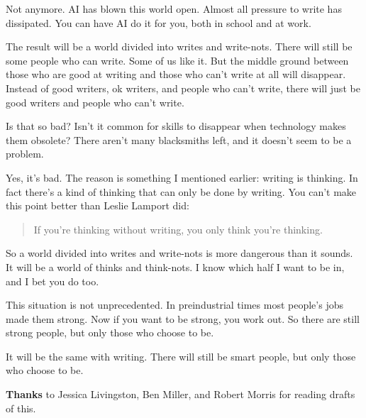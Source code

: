 Not
                  anymore. AI has blown this world open. Almost all pressure to
                  write has dissipated. You can have AI do it for you, both in
                  school and at work.

The result will be a world
                  divided into writes and write-nots. There will still be some
                  people who can write. Some of us like it. But the middle
                  ground between those who are good at writing and those who
                  can't write at all will disappear. Instead of good writers, ok
                  writers, and people who can't write, there will just be good
                  writers and people who can't write.

Is that so bad?
                  Isn't it common for skills to disappear when technology makes
                  them obsolete? There aren't many blacksmiths left, and it
                  doesn't seem to be a problem.

Yes, it's bad. The
                  reason is something I mentioned earlier: writing is thinking.
                  In fact there's a kind of thinking that can only be done by
                  writing. You can't make this point better than Leslie Lamport
                  did:
                  \begin{quote}

                    If you're thinking without writing, you only think you're
                    thinking.
                  
\end{quote}

                  So a world divided into writes and write-nots is more
                  dangerous than it sounds. It will be a world of thinks and
                  think-nots. I know which half I want to be in, and I bet you
                  do too.

This situation is not unprecedented. In
                  preindustrial times most people's jobs made them strong. Now
                  if you want to be strong, you work out. So there are still
                  strong people, but only those who choose to be.

It
                  will be the same with writing. There will still be smart
                  people, but only those who choose to be.









\textbf{Thanks} to Jessica Livingston, Ben Miller, and Robert
                    Morris for reading drafts of this.


              
            
          
          
            
              
                


                  
              
            
          
        
